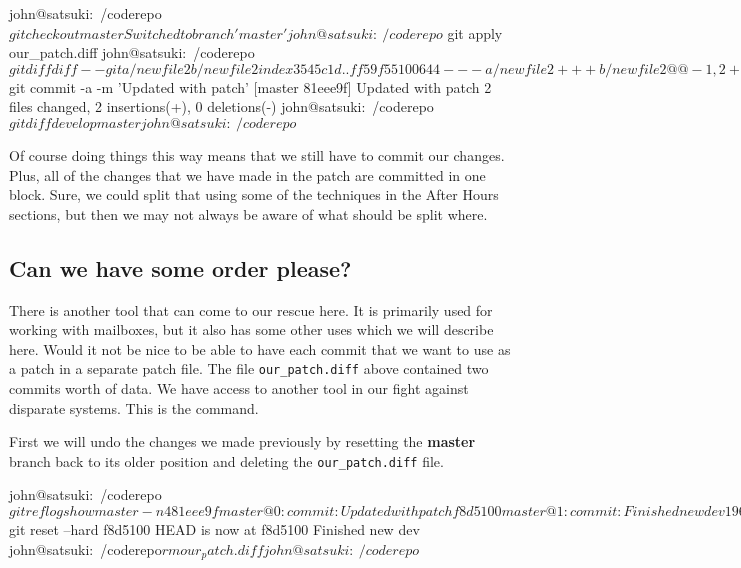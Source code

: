 \begin{code}
john@satsuki:~/coderepo$ git checkout master
Switched to branch 'master'
john@satsuki:~/coderepo$ git apply our_patch.diff
john@satsuki:~/coderepo$ git diff
diff --git a/newfile2 b/newfile2
index 3545c1d..ff59f55 100644
--- a/newfile2
+++ b/newfile2
@@ -1,2 +1,3 @@
 Another new file
 and a new awesome feature
+newer dev work
diff --git a/newfile3 b/newfile3
index 638113c..2e00739 100644
--- a/newfile3
+++ b/newfile3
@@ -1 +1,2 @@
 These changes are in the origin
+new dev work
john@satsuki:~/coderepo$ git commit -a -m 'Updated with patch'
[master 81eee9f] Updated with patch
 2 files changed, 2 insertions(+), 0 deletions(-)
john@satsuki:~/coderepo$ git diff develop master
john@satsuki:~/coderepo$
\end{code}

Of course doing things this way means that we still have to commit our changes.
Plus, all of the changes that we have made in the patch are committed in one block.
Sure, we could split that using some of the techniques in the After Hours sections, but then we may not always be aware of what should be split where.

\subsection{Can we have some order please?}
There is another tool that can come to our rescue here.
It is primarily used for working with  mailboxes, but it also has some other uses which we will describe here.
Would it not be nice to be able to have each commit that we want to use as a patch in a separate patch file.
The file \texttt{our\_patch.diff} above contained two commits worth of data.
We have access to another tool in our fight against disparate systems.
This is the  command.

First we will undo the changes we made previously by resetting the \textbf{master} branch back to its older position and deleting the \texttt{our\_patch.diff} file.

\begin{code}
john@satsuki:~/coderepo$ git reflog show master -n 4
81eee9f master@{0}: commit: Updated with patch
f8d5100 master@{1}: commit: Finished new dev
1968324 master@{2}: commit: Start new dev
john@satsuki:~/coderepo$ git reset --hard f8d5100
HEAD is now at f8d5100 Finished new dev
john@satsuki:~/coderepo$ rm our_patch.diff
john@satsuki:~/coderepo$
\end{code}

